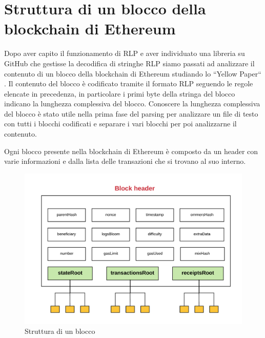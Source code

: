 \documentclass[12pt]{report}
\begin{document}
\section{Struttura di un blocco della blockchain di Ethereum}

Dopo aver capito il funzionamento di RLP e aver individuato una libreria su GitHub che gestisse la decodifica di stringhe RLP siamo passati ad analizzare il contenuto di un blocco della blockchain di Ethereum studiando lo ``Yellow Paper`` \cite{YellowPaper}.
Il contenuto del blocco è codificato tramite il formato RLP seguendo le regole elencate in precedenza, in particolare i primi byte della stringa del blocco indicano la lunghezza complessiva del blocco.
Conoscere la lunghezza complessiva del blocco è stato utile nella prima fase del parsing per analizzare un file di testo con tutti i blocchi codificati e separare i vari blocchi per poi analizzarne il contenuto.

Ogni blocco presente nella blockchain di Ethereum è composto da un header con varie informazioni e dalla lista delle transazioni che si trovano al suo interno.

\begin{figure}[H]
    \includegraphics[width=\textwidth]{BlockHeader}
    \caption{Struttura di un blocco}
\end{figure}
\end{document}
